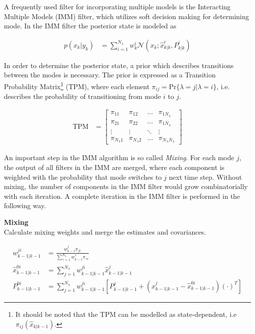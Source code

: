 A frequently used filter for incorporating multiple models is the Interacting Multiple Models (IMM) filter, which utilizes soft decision making for determining mode. In the IMM filter the posterior state is modeled as 

\begin{equation}
    \begin{split}
        p(x_k|y_k) &= \sum\limits_{i=1}^{N_{\lambda}}w_k^{i}\mathcal{N}(x_k;\hat{x}_{k|k}^{i}, P_{k|k}^{i})
    \end{split}
\end{equation}

In order to determine the posterior state, a prior which describes transitions between the modes is necessary. The prior is expressed as a Transition Probability Matrix\footnote{It should be noted that the TPM can be modelled as state-dependent, i.e $\pi_{ij}(\hat{x}_{k|k-1})$.} (TPM), where each element $\pi_{ij} = \text{Pr}\{\lambda = j|\lambda = i\}$, i.e. describes the probability of transitioning from mode $i$ to $j$. 

\begin{equation}
    \begin{split}
        \text{TPM} &= 
            \begin{bmatrix}
              \pi_{11}  & \pi_{12}  & \dots & \pi_{1N_{\lambda}} \\
              \pi_{21}  & \pi_{22}  & \dots & \pi_{1N_{\lambda}} \\
              \vdots    & \vdots    & \ddots & \vdots \\
              \pi_{N_{\lambda}1}  & \pi_{N_{\lambda}2} & \dots & \pi_{N_{\lambda}N_{\lambda}} 
            \end{bmatrix}
    \end{split}
\end{equation}

An important step in the IMM algorithm is so called \emph{Mixing}. For each mode $j$, the output of all filters in the IMM are merged, where each component is weighted with the probability that mode switches to $j$ next time step. Without mixing, the number of components in the IMM filter would grow combinatorially with each iteration. A complete iteration in the IMM filter is performed in the following way. 

\textbf{Mixing}\\
Calculate mixing weights and merge the estimates and covariances. 

\begin{equation}
    \begin{split}
        w_{k-1|k-1}^{ji} &= \frac{w_{k-1}^j\pi_{ji}}{\sum_{\gamma=1}^{N_{\lambda}}w_{k-1}^{\gamma}\pi_{\gamma i}} \\
        \hat{x}_{k-1|k-1}^{0i} &= \sum\limits_{j=1}^{N_{\lambda}}w_{k-1|k-1}^{ji}\hat{x}_{k-1|k-1}^{j} \\
        P_{k-1|k-1}^{0i} &= \sum\limits_{j=1}^{N_{\lambda}}w_{k-1|k-1}^{ji}\left[P_{k-1|k-1}^{j} + (\hat{x}_{k-1|k-1}^{j}-\hat{x}_{k-1|k-1}^{0i})(\cdot)^{T}\right]
    \end{split}
\end{equation}

